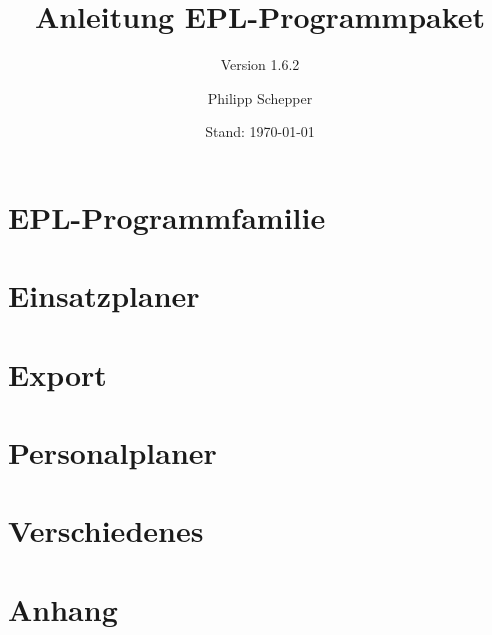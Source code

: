 \documentclass[a4paper,ngerman,oneside]{scrbook}
\title{Anleitung EPL-Programmpaket}
\subtitle{Version 1.6.2}
\author{Philipp Schepper}
\date{Stand: \today}
\begin{document}
\maketitle

\frontmatter
\tableofcontents


\mainmatter
\part*{EPL-Programmfamilie}


\part{Einsatzplaner}




\part{Export}


\part{Personalplaner}

\part{Verschiedenes}



\appendix
\part{Anhang}



\end{document}
